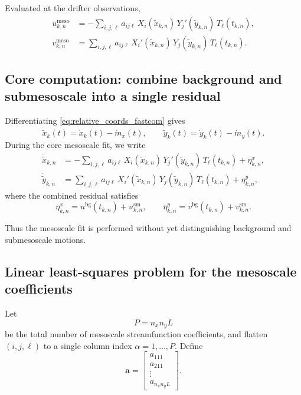Evaluated at the drifter observations,
\begin{align}
u^{\mathrm{meso}}_{k,n}
&=
-\sum_{i,j,\ell}
a_{ij\ell}\,
X_i(\tilde{x}_{k,n})\,Y_j'(\tilde{y}_{k,n})\,T_\ell(t_{k,n}),
\label{eq:u_meso_kn}
\\
v^{\mathrm{meso}}_{k,n}
&=
\sum_{i,j,\ell}
a_{ij\ell}\,
X_i'(\tilde{x}_{k,n})\,Y_j(\tilde{y}_{k,n})\,T_\ell(t_{k,n}).
\label{eq:v_meso_kn}
\end{align}

\subsection{Core computation: combine background and submesoscale into a single residual}

Differentiating \eqref{eq:relative_coords_fastcom} gives
\begin{equation}
\dot{\tilde{x}}_k(t)=\dot{x}_k(t)-\dot{m}_x(t),
\qquad
\dot{\tilde{y}}_k(t)=\dot{y}_k(t)-\dot{m}_y(t).
\end{equation}
During the core mesoscale fit, we write
\begin{align}
\dot{\tilde{x}}_{k,n}
&=
-\sum_{i,j,\ell}
a_{ij\ell}\,
X_i(\tilde{x}_{k,n})\,Y_j'(\tilde{y}_{k,n})\,T_\ell(t_{k,n})
+\eta^x_{k,n},
\label{eq:core_residual_x}
\\
\dot{\tilde{y}}_{k,n}
&=
\sum_{i,j,\ell}
a_{ij\ell}\,
X_i'(\tilde{x}_{k,n})\,Y_j(\tilde{y}_{k,n})\,T_\ell(t_{k,n})
+\eta^y_{k,n},
\label{eq:core_residual_y}
\end{align}
where the combined residual satisfies
\begin{equation}
\eta^x_{k,n}
=
u^{\mathrm{bg}}(t_{k,n})+u^{\mathrm{sm}}_{k,n},
\qquad
\eta^y_{k,n}
=
v^{\mathrm{bg}}(t_{k,n})+v^{\mathrm{sm}}_{k,n}.
\label{eq:eta_decomp}
\end{equation}

Thus the mesoscale fit is performed without yet distinguishing background and submesoscale
motions.

\subsection{Linear least-squares problem for the mesoscale coefficients}

Let
\begin{equation}
P=n_x n_y L
\end{equation}
be the total number of mesoscale streamfunction coefficients, and flatten $(i,j,\ell)$ to a
single column index $\alpha=1,\dots,P$. Define
\begin{equation}
\mathbf{a}=
\begin{bmatrix}
a_{111}\\
a_{211}\\
\vdots\\
a_{n_x n_y L}
\end{bmatrix}.
\end{equation}


